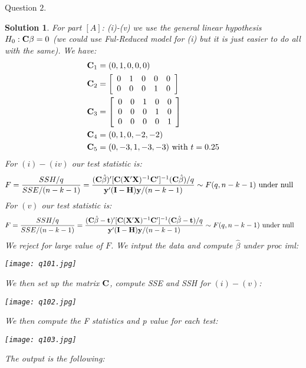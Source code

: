 \documentclass[11pt]{article}
\newtheorem{sol}{Solution}
\begin{document}
Question $2$.
\begin{sol}
	For part $[A]$:\vskip 2mm
	(i)-(v) we use the general linear hypothesis $H_0: {\bf C}\beta = 0$ (we could use Ful-Reduced model for (i) but it is just easier to do all with the same).\vskip 2mm
	We have:
	\begin{align*}
		{\bf C}_1 &= (0, 1, 0, 0, 0)\\
		{\bf C}_2 &= \left[\begin{array}{ccccc} 0&1&0&0&0\\ 0&0&0&1&0\end{array}\right]\\
		{\bf C}_3 &= \left[\begin{array}{ccccc} 0&0&1&0&0\\ 0&0&0&1&0\\ 0&0&0&0&1\end{array}\right]\\
		{\bf C}_4 &= (0, 1, 0, -2, -2)\\
		{\bf C}_5 &= (0, -3, 1, -3, -3) \text{ with } t = 0.25
	\end{align*}
	For $(i) - (iv)$ our test statistic is:
	\begin{align*}
		F &= \frac{SSH/q}{SSE/(n - k - 1)} = \frac{({\bf C}\hat{\beta})'[{\bf C}({\bf X}'{\bf X})^{-1}{\bf C}']^{-1}({\bf C}\hat{\beta})/q}{{\bf y}'({\bf I} - {\bf H}){\bf y}/(n - k - 1)} \sim F(q, n - k - 1) \text{ under null}
	\end{align*}
	For $(v)$ our test statistic is:
	\begin{align*}
		F &= \frac{SSH/q}{SSE/(n - k - 1)} = \frac{({\bf C}\hat{\beta} - {\bf t})'[{\bf C}({\bf X}'{\bf X})^{-1}{\bf C}']^{-1}({\bf C}\hat{\beta} - {\bf t})/q}{{\bf y}'({\bf I} - {\bf H}){\bf y}/(n - k - 1)} \sim F(q, n - k - 1) \text{ under null}
	\end{align*}
	We reject for large value of $F$.\vskip 2mm
	We intput the data and compute $\hat{\beta}$ under proc iml:
	\begin{center}
		\texttt{[image: q101.jpg]}
	\end{center}
	We then set up the matrix ${\bf C}$, compute SSE and SSH for $(i) - (v)$:
	\begin{center}
		\texttt{[image: q102.jpg]}
	\end{center}
	We then compute the F statistics and p value for each test:
	\begin{center}
		\texttt{[image: q103.jpg]}
	\end{center}	
	The output is the following:

\end{sol}
\end{document}

